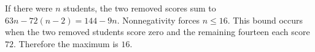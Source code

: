 If there were $n$ students, the two removed scores sum to $63n-72(n-2)=144-9n$. Nonnegativity forces $n\le16$. This bound occurs when the two removed students score zero and the remaining fourteen each score $72$. Therefore the maximum is $\boxed{16}$.
